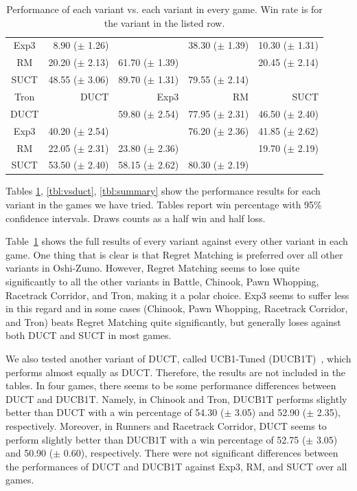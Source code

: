 \documentclass[conference]{IEEEtran}
\begin{document}
\begin{table}
\begin{center}
\begin{tabular}{|c|rrrr|}
           Exp3    & 8.90 ($\pm$ 1.26)   &          & 38.30 ($\pm$ 1.39)   & 10.30 ($\pm$ 1.31)   \\
             RM    & 20.20 ($\pm$ 2.13)   & 61.70 ($\pm$ 1.39)   &          & 20.45 ($\pm$ 2.14)   \\
           SUCT    & 48.55 ($\pm$ 3.06)   & 89.70 ($\pm$ 1.31)   & 79.55 ($\pm$ 2.14)   &          \\
\hline
\hline
           Tron   &       DUCT   &       Exp3   &         RM   &       SUCT   \\
\hline
           DUCT    &          & 59.80 ($\pm$ 2.54)   & 77.95 ($\pm$ 2.31)   & 46.50 ($\pm$ 2.40)   \\
           Exp3    & 40.20 ($\pm$ 2.54)   &          & 76.20 ($\pm$ 2.36)   & 41.85 ($\pm$ 2.62)   \\
             RM    & 22.05 ($\pm$ 2.31)   & 23.80 ($\pm$ 2.36)   &          & 19.70 ($\pm$ 2.19)   \\
           SUCT    & 53.50 ($\pm$ 2.40)   & 58.15 ($\pm$ 2.62)   & 80.30 ($\pm$ 2.19)   &          \\
\hline
\end{tabular}
\end{center}
\caption{Performance of each variant vs. each variant in every game. Win rate is for the variant in the listed row. \label{tbl:cross}}
\end{table}



Tables \ref{tbl:cross}, \ref{tbl:vsduct}, \ref{tbl:summary} show the performance results for each variant in the games we have tried. 
Tables report win percentage with 95\% confidence intervals. Draws counts as a half win and half loss. 

Table~\ref{tbl:cross} shows the full results of every variant against every other variant in each game. One thing that is clear is that 
Regret Matching is preferred over all other variants in Oshi-Zumo. However, Regret Matching seems to lose quite significantly to all the 
other variants in Battle, Chinook, Pawn Whopping, Racetrack Corridor, and Tron, making it a polar choice. Exp3 seems to suffer less in this
regard and in some cases (Chinook, Pawn Whopping, Racetrack Corridor, and Tron) beats Regret Matching quite significantly, but generally loses
against both DUCT and SUCT in most games. 


We also tested another variant of DUCT, called UCB1-Tuned (DUCB1T)~\cite{Auer02Finite}, which performs almost equally as DUCT. Therefore, the results are not included in the tables. In four games, there seems to be some performance differences between DUCT and DUCB1T. Namely, in Chinook and Tron, DUCB1T performs slightly better than DUCT with a win percentage of 54.30 ($\pm$ 3.05) and 52.90 ($\pm$ 2.35), respectively. Moreover, in Runners and Racetrack Corridor, DUCT seems to perform slightly better than DUCB1T with a win percentage of 52.75 ($\pm$ 3.05) and 50.90 ($\pm$ 0.60), respectively.
There were not significant differences between the performances of DUCT and DUCB1T against Exp3, RM, and SUCT over all games.
\end{document}
